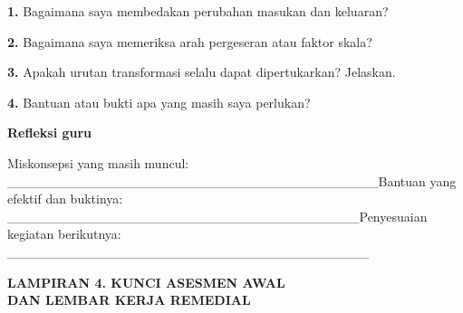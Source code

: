 \documentclass[11pt,a4paper]{article}
\begin{document}
\noindent\textbf{1.} Bagaimana saya membedakan perubahan masukan dan keluaran?\par\vspace{6mm}
\noindent\textbf{2.} Bagaimana saya memeriksa arah pergeseran atau faktor skala?\par\vspace{6mm}
\noindent\textbf{3.} Apakah urutan transformasi selalu dapat dipertukarkan? Jelaskan.\par\vspace{6mm}
\noindent\textbf{4.} Bantuan atau bukti apa yang masih saya perlukan?\par\vspace{6mm}
\par\medskip\noindent\textbf{Refleksi guru}\par\smallskip
{\small Miskonsepsi yang masih muncul: \_\_\_\_\_\_\_\_\_\_\_\_\_\_\_\_\_\_\_\_\_\_\_\_\_\_\_\_\_\_\_\_\_\_\_\_\_\_\_\newline Bantuan yang efektif dan buktinya: \_\_\_\_\_\_\_\_\_\_\_\_\_\_\_\_\_\_\_\_\_\_\_\_\_\_\_\_\_\_\_\_\_\_\_\_\_\newline Penyesuaian kegiatan berikutnya: \_\_\_\_\_\_\_\_\_\_\_\_\_\_\_\_\_\_\_\_\_\_\_\_\_\_\_\_\_\_\_\_\_\_\_\_\_\_\par}\medskip
\clearpage
\begin{center}\bfseries\large LAMPIRAN 4. KUNCI ASESMEN AWAL\\[2pt] DAN LEMBAR KERJA REMEDIAL\end{center}\medskip
\end{document}
